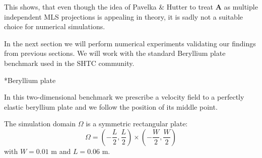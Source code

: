 \documentclass[oneside, a4paper, onecolumn, 11pt]{article}
\renewcommand{\AA}{\mathbf{A}}
\begin{document}
\begin{section}
\begin{subsection}
\begin{subsection}
\begin{subsubsection}
    This shows, that even though the idea of Pavelka \& Hutter
    \cite{hutter-pavelka} to treat $\AA$ as multiple independent
    MLS projections is appealing in theory, it is sadly not
    a suitable choice for numerical simulations.
    
    In the next section we will perform numerical experiments 
    validating
    our findings from previous sections. We will work with the
    standard Beryllium plate benchmark used in the SHTC community.
\end{subsubsection}
     
\begin{subsection}*{Beryllium plate}
%

%

In this two-dimensional benchmark we prescribe
a velocity field to a perfectly elastic beryllium plate and
we follow the position of its middle point.

The simulation domain $\Omega$ is a symmetric rectangular plate:
\[
\Omega = \left( -\frac{L}{2}, \frac{L}{2}\right) \times
\left( -\frac{W}{2}, \frac{W}{2} \right) 
\] 
with $W = 0.01 \text{ m}$ and $L = 0.06 \text{ m}$.


\end{subsection}
\end{subsection}
\end{subsection}
\end{section}
\end{document}
